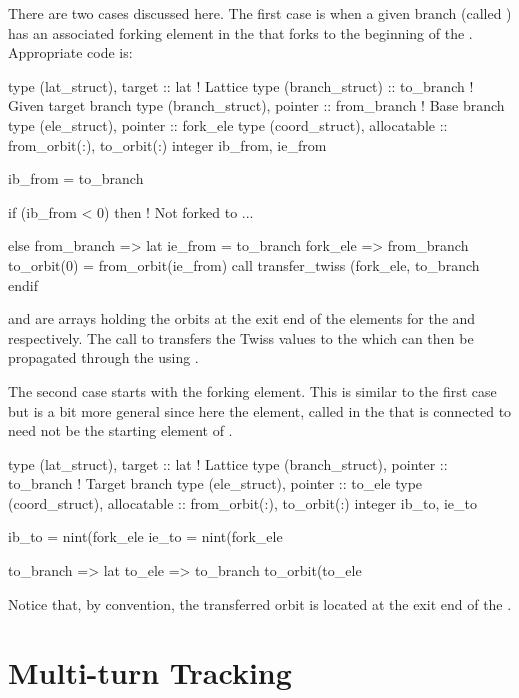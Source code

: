 {{{{{{{{There are two cases discussed here. The first case is when a given
branch (called ) has an associated forking element in
the  that forks to the beginning of the
. Appropriate code is:
\begin{example}
  type (lat_struct), target :: lat   ! Lattice 
  type (branch_struct) :: to_branch  ! Given target branch
  type (branch_struct), pointer  :: from_branch ! Base branch
  type (ele_struct), pointer :: fork_ele
  type (coord_struct), allocatable :: from_orbit(:), to_orbit(:)
  integer ib_from, ie_from

  ib_from  = to_branch%

  if (ib_from < 0) then
    ! Not forked to ...

  else
    from_branch => lat%
    ie_from = to_branch%
    fork_ele => from_branch%
    to_orbit(0) = from_orbit(ie_from)
    call transfer_twiss (fork_ele, to_branch%
  endif
\end{example}
 and  are arrays holding the
orbits at the exit end of the elements for the  and
 respectively. The call to 
transfers the Twiss values to the  which can then be
propagated through the  using .

The second case starts with the  forking element.  This
is similar to the first case but is a bit more general since here the
element, called  in the  that is connected to
 need not be the starting element of .
\begin{example}
  type (lat_struct), target :: lat   ! Lattice 
  type (branch_struct), pointer :: to_branch  ! Target branch
  type (ele_struct), pointer :: to_ele
  type (coord_struct), allocatable :: from_orbit(:), to_orbit(:)
  integer ib_to, ie_to

  ib_to  = nint(fork_ele%
  ie_to  = nint(fork_ele%

  to_branch => lat%
  to_ele => to_branch%
  to_orbit(to_ele%
\end{example}  
Notice that, by convention, the transferred orbit is located at the
exit end of the .

\section{Multi-turn Tracking}

}}}}}}}}
